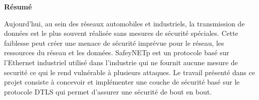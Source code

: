 %

\begin{center}
\textbf{\Large{Résumé}}
\end{center}
Aujourd’hui, au sein des réseaux automobiles et industriels, la transmission de données est le plus souvent réalisée
sans mesures de sécurité spéciales. Cette faiblesse peut créer une menace de sécurité imprévue pour le réseau, les
ressources du réseau et les données. SafeyNETp est un protocole basé sur l'Ethernet industriel utilisé dans
l'industrie qui ne fournit aucune mesure de securité ce qui le rend
vulnérable à plusieurs attaques. Le travail présenté dans ce projet consiste à concevoir et implémenter une
couche de sécurité basé sur le protocole DTLS qui permet d'assurer une sécurité de bout en bout.


